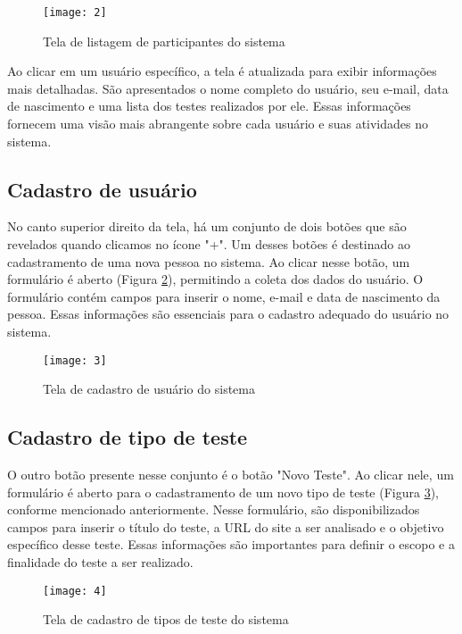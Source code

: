 \begin{figure}[h]
  \caption{Tela de listagem de participantes do sistema}
  \centering
  \texttt{[image: 2]}
  \label{fig:2}
\end{figure}
\FloatBarrier

Ao clicar em um usuário específico, a tela é atualizada para exibir informações mais detalhadas. São apresentados o nome completo do usuário, seu e-mail, data de nascimento e uma lista dos testes realizados por ele. Essas informações fornecem uma visão mais abrangente sobre cada usuário e suas atividades no sistema.

\clearpage
\subsection{Cadastro de usuário}

No canto superior direito da tela, há um conjunto de dois botões que são revelados quando clicamos no ícone "+". Um desses botões é destinado ao cadastramento de uma nova pessoa no sistema. Ao clicar nesse botão, um formulário é aberto (Figura \ref{fig:3}), permitindo a coleta dos dados do usuário. O formulário contém campos para inserir o nome, e-mail e data de nascimento da pessoa. Essas informações são essenciais para o cadastro adequado do usuário no sistema.

\begin{figure}[h]
  \caption{Tela de cadastro de usuário do sistema}
  \centering
  \texttt{[image: 3]}
  \label{fig:3}
\end{figure}
\FloatBarrier

\clearpage
\subsection{Cadastro de tipo de teste}

O outro botão presente nesse conjunto é o botão "Novo Teste". Ao clicar nele, um formulário é aberto para o cadastramento de um novo tipo de teste (Figura \ref{fig:4}), conforme mencionado anteriormente. Nesse formulário, são disponibilizados campos para inserir o título do teste, a URL do site a ser analisado e o objetivo específico desse teste. Essas informações são importantes para definir o escopo e a finalidade do teste a ser realizado.

\begin{figure}[h]
  \caption{Tela de cadastro de tipos de teste do sistema}
  \centering
  \texttt{[image: 4]}
  \label{fig:4}
\end{figure}
\FloatBarrier


